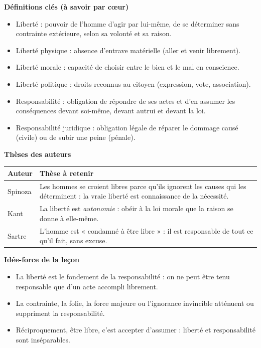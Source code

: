 \documentclass[11pt]{article}
\newcommand{\cle}[1]{{\popxbold\color{popdark}#1}}
\begin{document}
\begin{aretenir}
\textbf{Définitions clés (à savoir par cœur)}
\begin{itemize}
  \item \cle{Liberté} : pouvoir de l'homme d'agir par lui-même, de se déterminer sans contrainte extérieure, selon sa volonté et sa raison.
  \item \cle{Liberté physique} : absence d'entrave matérielle (aller et venir librement).
  \item \cle{Liberté morale} : capacité de choisir entre le bien et le mal en conscience.
  \item \cle{Liberté politique} : droits reconnus au citoyen (expression, vote, association).
  \item \cle{Responsabilité} : obligation de répondre de ses actes et d'en assumer les conséquences devant soi-même, devant autrui et devant la loi.
  \item \cle{Responsabilité juridique} : obligation légale de réparer le dommage causé (civile) ou de subir une peine (pénale).
\end{itemize}

\textbf{Thèses des auteurs}
\begin{center}
\begin{tabularx}{\linewidth}{|l|X|}
\hline
\rowcolor{popblueL} \textbf{Auteur} & \textbf{Thèse à retenir} \\
\hline
Spinoza & Les hommes se croient libres parce qu'ils ignorent les causes qui les déterminent : la vraie liberté est connaissance de la nécessité. \\
\hline
Kant & La liberté est \emph{autonomie} : obéir à la loi morale que la raison se donne à elle-même. \\
\hline
Sartre & L'homme est « condamné à être libre » : il est responsable de tout ce qu'il fait, sans excuse. \\
\hline
\end{tabularx}
\end{center}

\textbf{Idée-force de la leçon}
\begin{itemize}
  \item La \cle{liberté} est le \cle{fondement} de la responsabilité : on ne peut être tenu responsable que d'un acte accompli librement.
  \item La contrainte, la folie, la force majeure ou l'ignorance invincible atténuent ou suppriment la responsabilité.
  \item Réciproquement, être libre, c'est accepter d'assumer : liberté et responsabilité sont inséparables.
\end{itemize}


\end{aretenir}
\end{document}

